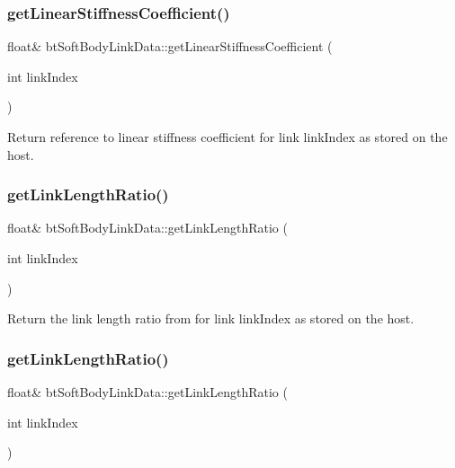 \subsubsection{\texorpdfstring{get\+Linear\+Stiffness\+Coefficient()}{getLinearStiffnessCoefficient()}\hspace{0.1cm}{\footnotesize\ttfamily [2/2]}}
{\footnotesize\ttfamily float\& bt\+Soft\+Body\+Link\+Data\+::get\+Linear\+Stiffness\+Coefficient (\begin{DoxyParamCaption}\item[{int}]{link\+Index }\end{DoxyParamCaption})\hspace{0.3cm}{\ttfamily [inline]}}

Return reference to linear stiffness coefficient for link link\+Index as stored on the host. \mbox{\label{classbtSoftBodyLinkData_a1d1b051d331898d172d709676dca5ad7}} 
\subsubsection{\texorpdfstring{get\+Link\+Length\+Ratio()}{getLinkLengthRatio()}\hspace{0.1cm}{\footnotesize\ttfamily [1/2]}}
{\footnotesize\ttfamily float\& bt\+Soft\+Body\+Link\+Data\+::get\+Link\+Length\+Ratio (\begin{DoxyParamCaption}\item[{int}]{link\+Index }\end{DoxyParamCaption})\hspace{0.3cm}{\ttfamily [inline]}}

Return the link length ratio from for link link\+Index as stored on the host. \mbox{\label{classbtSoftBodyLinkData_a1d1b051d331898d172d709676dca5ad7}} 
\subsubsection{\texorpdfstring{get\+Link\+Length\+Ratio()}{getLinkLengthRatio()}\hspace{0.1cm}{\footnotesize\ttfamily [2/2]}}
{\footnotesize\ttfamily float\& bt\+Soft\+Body\+Link\+Data\+::get\+Link\+Length\+Ratio (\begin{DoxyParamCaption}\item[{int}]{link\+Index }\end{DoxyParamCaption})\hspace{0.3cm}{\ttfamily [inline]}}

